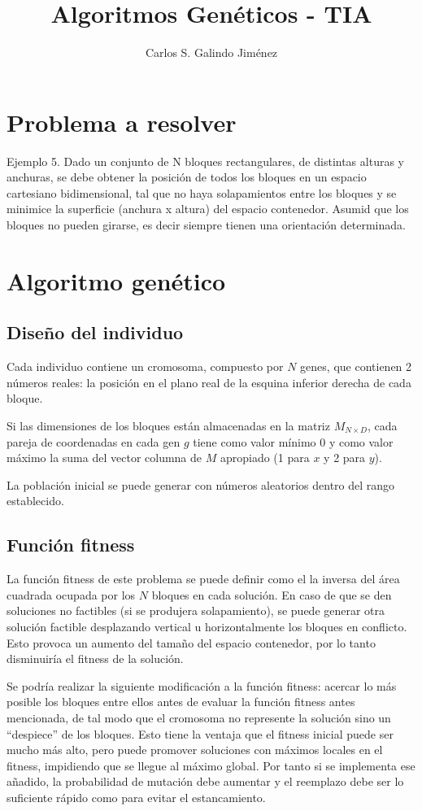 \documentclass[a4paper]{article}
\title{Algoritmos Genéticos - TIA}
\author{Carlos S. Galindo Jiménez}
\begin{document}
\maketitle
\section{Problema a resolver}
Ejemplo 5. Dado un conjunto de N bloques rectangulares, de distintas alturas y anchuras, se debe obtener la posición de todos los bloques en un espacio cartesiano bidimensional, tal que no haya solapamientos entre los bloques y se minimice la superficie  (anchura x altura)  del espacio contenedor. Asumid que los bloques no pueden girarse, es decir  siempre tienen una orientación determinada.

\section{Algoritmo genético}
\subsection{Diseño del individuo}
Cada individuo contiene un cromosoma, compuesto por $N$ genes, que contienen 2 números reales: la posición en el plano real de la esquina inferior derecha de cada bloque.

Si las dimensiones de los bloques están almacenadas en la matriz $M_{N\times D}$, cada pareja de coordenadas en cada gen $g$ tiene como valor mínimo $0$ y como valor máximo la suma del vector columna de $M$ apropiado (1 para $x$ y 2 para $y$).

La población inicial se puede generar con números aleatorios dentro del rango establecido.

\subsection{Función fitness}
La función fitness de este problema se puede definir como el la inversa del área cuadrada ocupada por los $N$ bloques en cada solución. En caso de que se den soluciones no factibles (si se produjera solapamiento), se puede generar otra solución factible desplazando vertical u horizontalmente los bloques en conflicto. Esto provoca un aumento del tamaño del espacio contenedor, por lo tanto disminuiría el fitness de la solución.

Se podría realizar la siguiente modificación a la función fitness: acercar lo más posible los bloques entre ellos antes de evaluar la función fitness antes mencionada, de tal modo que el cromosoma no represente la solución sino un ``despiece'' de los bloques. Esto tiene la ventaja que el fitness inicial puede ser mucho más alto, pero puede promover soluciones con máximos locales en el fitness, impidiendo que se llegue al máximo global. Por tanto si se implementa ese añadido, la probabilidad de mutación debe aumentar y el reemplazo debe ser lo suficiente rápido como para evitar el estancamiento.
\end{document}
